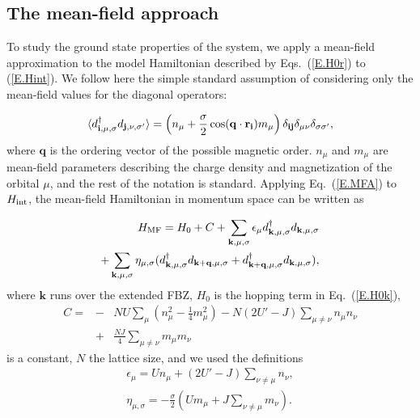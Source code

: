 \documentclass[aps,prb,superscriptaddress,preprintnumbers,
showpacs,legalpaper,twoside,twocolumn,amsmath,amssymb]{revtex4}
\begin{document}
\subsection{The mean-field approach}
To study the ground state properties of the system, we
apply a mean-field approximation to the model Hamiltonian described
by Eqs.~(\ref{E.H0r}) to (\ref{E.Hint}).
We follow here the simple standard assumption of considering only the
mean-field values for the diagonal operators:\cite{nomura}

\begin{eqnarray}\label{E.MFA}
\langle d^\dagger_{{\bf i},\mu,\sigma} d_{{\bf j},\nu,\sigma'}\rangle =
\left(n_\mu+\frac{\sigma}{2}\cos(\mathbf{q}\cdot\mathbf{r}_{\bf i})m_\mu\right)
\delta_{\bf ij}\delta_{\mu\nu}\delta_{\sigma\sigma'},
\end{eqnarray}
where $\mathbf{q}$ is the ordering vector of the possible magnetic
order. $n_\mu$ and $m_\mu$ are mean-field parameters describing the
charge density and magnetization of the orbital $\mu$, and the rest of the
notation is standard. Applying
Eq.~(\ref{E.MFA}) to $H_{\rm int}$, the mean-field Hamiltonian in
momentum space can be written as

\begin{eqnarray}\label{E.HMF}
H_{\rm MF} = H_0 + C + \sum_{\mathbf{k},\mu,\sigma}
\epsilon_\mu d^\dagger_{\mathbf{k},\mu,\sigma}
d_{\mathbf{k},\mu,\sigma}\nonumber\\
+ \sum_{\mathbf{k},\mu,\sigma} \eta_{\mu,\sigma}
 (d^\dagger_{\mathbf{k},\mu,\sigma} d_{\mathbf{k+q},\mu,\sigma} +
d^\dagger_{\mathbf{k+q},\mu,\sigma} d_{\mathbf{k},\mu,\sigma}),
\end{eqnarray}
where $\mathbf{k}$ runs over the extended FBZ, $H_0$ is
the hopping term in Eq.~(\ref{E.H0k}),
\begin{eqnarray}
C=&-&NU\sum_{\mu}\left(n^2_\mu-\frac{1}{4}m^2_\mu\right)
- N(2U'-J)\sum_{\mu\neq\nu}n_\mu n_\nu \nonumber \\
&+& \frac{NJ}{4} \sum_{\mu\neq\nu} m_\mu m_\nu \nonumber
\end{eqnarray}
is a constant, $N$ the lattice size, and we used the definitions
\begin{eqnarray}
\epsilon_\mu = Un_\mu + (2U'-J)\sum_{\nu\neq\mu}
n_\nu, \\
\eta_{\mu,\sigma} =
-\frac{\sigma}{2}\left(Um_\mu+J\sum_{\nu\neq\mu}m_\nu\right).
\end{eqnarray}
\end{document}
